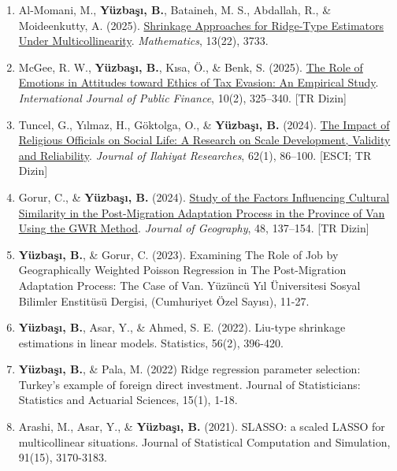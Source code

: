 \documentclass[10pt,letterpaper]{article}
\newenvironment{etaremune}{\begin{enumerate}}{\end{enumerate}}
\newcommand{\JournalInfo}[2]{\hspace{0.3em}{\small\textsf{[#1; #2]}}}
\begin{document}
\begin{etaremune}
\item Al-Momani, M., {\bf Y\"{u}zba\c{s}{\i}, B.}, Bataineh, M. S., Abdallah, R., \& Moideenkutty, A. (2025). \href{https://doi.org/10.3390/math13223733}{Shrinkage Approaches for Ridge-Type Estimators Under Multicollinearity}. \textit{Mathematics}, 13(22), 3733. \JournalInfo{SCIE}{Q1}

\item McGee, R. W., {\bf Y\"{u}zba\c{s}{\i}, B.}, K{\i}sa, \"{O}., \& Benk, S. (2025). \href{https://doi.org/10.30927/ijpf.1725129}{The Role of Emotions in Attitudes toward Ethics of Tax Evasion: An Empirical Study}. \textit{International Journal of Public Finance}, 10(2), 325--340. {\small\textsf{[TR Dizin]}}

\item Tuncel, G., Y{\i}lmaz, H., G\"{o}ktolga, O., \& {\bf Y\"{u}zba\c{s}{\i}, B.} (2024). \href{https://doi.org/10.29288/ilted.1486541}{The Impact of Religious Officials on Social Life: A Research on Scale Development, Validity and Reliability}. \textit{Journal of Ilahiyat Researches}, 62(1), 86--100. {\small\textsf{[ESCI; TR Dizin]}}

\item Gorur, C., \& {\bf Y\"{u}zba\c{s}{\i}, B.} (2024). \href{https://doi.org/10.26650/JGEOG2024-1353398}{Study of the Factors Influencing Cultural Similarity in the Post-Migration Adaptation Process in the Province of Van Using the GWR Method}. \textit{Journal of Geography}, 48, 137--154. {\small\textsf{[TR Dizin]}}

\item {\bf Y\"{u}zba\c{s}{\i}, B.}, \& Gorur, C. (2023). Examining The Role of Job by Geographically Weighted Poisson Regression in The Post-Migration Adaptation Process: The Case of Van. Yüzüncü Yıl Üniversitesi Sosyal Bilimler Enstitüsü Dergisi, (Cumhuriyet Özel Sayısı), 11-27.

\item {\bf Y\"{u}zba\c{s}{\i}, B.}, Asar, Y., \& Ahmed, S. E. (2022). Liu-type shrinkage estimations in linear models. Statistics, 56(2), 396-420. \JournalInfo{SCIE}{Q2; WoS/JCR 2025}

\item {\bf Y\"{u}zba\c{s}{\i}, B.}, \& Pala, M. (2022) Ridge regression parameter selection: Turkey's example of foreign direct investment. Journal of Statisticians: Statistics and Actuarial Sciences, 15(1), 1-18.

\item Arashi, M., Asar, Y., \& {\bf Y\"{u}zba\c{s}{\i}, B.} (2021). SLASSO: a scaled LASSO for multicollinear situations. Journal of Statistical Computation and Simulation, 91(15), 3170-3183. \JournalInfo{SCIE}{Q2}



\end{etaremune}
\end{document}
